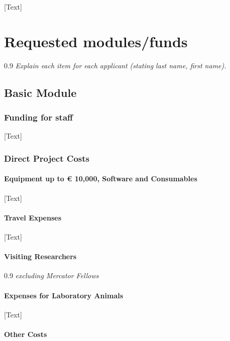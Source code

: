 \documentclass[a4paper,11pt]{article}
\newenvironment{comment}{\begin{spacing}{0.9}\footnotesize\it}{\end{spacing}}
\begin{document}
[Text]

\section{Requested modules/funds}
\begin{comment}
  Explain each item for each applicant (stating last name, first name).
\end{comment}

\subsection{Basic Module}

\subsubsection{Funding for staff}

[Text]

\subsubsection{Direct Project Costs}

\paragraph{Equipment up to € 10,000, Software and Consumables}

[Text]

\paragraph{Travel Expenses}

[Text]

\paragraph{Visiting Researchers}
\begin{comment}
  excluding Mercator Fellows
\end{comment}

\paragraph{Expenses for Laboratory Animals}

[Text]

\paragraph{Other Costs}
\end{document}
